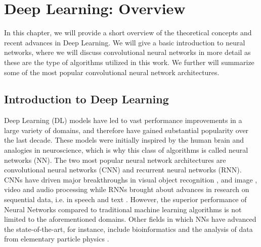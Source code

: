 
\chapter{Deep Learning: Overview} %

\label{Chapter2} %


In this chapter, we will provide a short overview of the theoretical concepts and recent advances in Deep Learning. We will give a basic introduction to neural networks, where we will discuss convolutional neural networks in more detail as these are the type of algorithms utilized in this work. We further will summarize some of the most popular convolutional neural network architectures.




\section{Introduction to Deep Learning}

Deep Learning (DL) models have led to vast performance improvements in a large variety of domains, and therefore have gained substantial popularity over the last decade. These models were initially inspired by the human brain and analogies in neuroscience, which is why this class of algorithms is called neural networks (NN). The two most popular neural network architectures are convolutional neural networks (CNN) and recurrent neural networks (RNN). CNNs have driven major breakthroughs in visual object recognition \parencite{krizhevsky2012}, and image \parencite{zhang2015}, video \parencite{tompson2014} and audio \parencite{hinton2012} processing while RNNs brought about advances in research on sequential data, i.e. in speech and text \parencite{collobert2011}. However, the superior performance of Neural Networks compared to traditional machine learning algorithms is not limited to the aforementioned domains. Other fields in which NNs have advanced the state-of-the-art, for instance, include bioinformatics \parencite{junshui2015} and the analysis of data from elementary particle physics \parencite{ciodaroc2012}.


